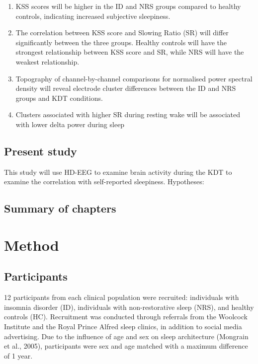 \documentclass[
]{article}
\providecommand{\tightlist}{%
  \setlength{\itemsep}{0pt}\setlength{\parskip}{0pt}}
\begin{document}
\begin{enumerate}
\def\labelenumi{\arabic{enumi}.}
\tightlist
\item
  KSS scores will be higher in the ID and NRS groups compared to healthy
  controls, indicating increased subjective sleepiness.
\item
  The correlation between KSS score and Slowing Ratio (SR) will differ
  significantly between the three groups. Healthy controls will have the
  strongest relationship between KSS score and SR, while NRS will have
  the weakest relationship.
\item
  Topography of channel-by-channel comparisons for normalised power
  spectral density will reveal electrode cluster differences between the
  ID and NRS groups and KDT conditions.
\item
  Clusters associated with higher SR during resting wake will be
  associated with lower delta power during sleep
\end{enumerate}

\subsection{Present study}\label{present-study}

This study will use HD-EEG to examine brain activity during the KDT to
examine the correlation with self-reported sleepiness. Hypotheses:

\subsection{Summary of chapters}\label{summary-of-chapters}

\newpage

\section{Method}\label{sec:method}

\subsection{Participants}\label{participants}

12 participants from each clinical population were recruited:
individuals with insomnia disorder (ID), individuals with
non-restorative sleep (NRS), and healthy controls (HC). Recruitment was
conducted through referrals from the Woolcock Institute and the Royal
Prince Alfred sleep clinics, in addition to social media advertising.
Due to the influence of age and sex on sleep architecture (Mongrain et
al., 2005), participants were sex and age matched with a maximum
difference of 1 year.
\end{document}
